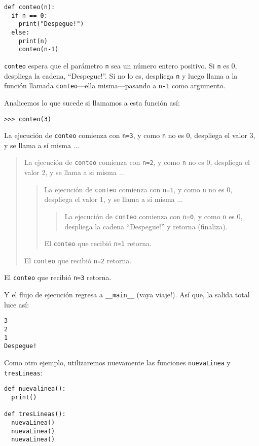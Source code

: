 \pagebreak{}

\begin{lstlisting}
def conteo(n):
  if n == 0:
    print("Despegue!")
  else:
    print(n)
    conteo(n-1)
\end{lstlisting}

\texttt{conteo} espera que el parámetro \texttt{n} sea un número entero
positivo. Si \texttt{n} es 0, despliega la cadena, ``Despegue!''.
Si no lo es, despliega \texttt{n} y luego llama a la función llamada
\texttt{conteo}—ella misma—pasando a \texttt{n-1} como argumento.

Analicemos lo que sucede si llamamos a esta función así:
\begin{lstlisting}
>>> conteo(3)
\end{lstlisting}

La ejecución de \texttt{conteo} comienza con \texttt{n=3}, y como
\texttt{n} no es 0, despliega el valor 3, y se llama a sí misma ...
\begin{quote}
La ejecución de \texttt{conteo} comienza con \texttt{n=2}, y como
\texttt{n} no es 0, despliega el valor 2, y se llama a si misma ...

\begin{quote}
La ejecución de \texttt{conteo} comienza con \texttt{n=1}, y como
\texttt{n} no es 0, despliega el valor 1, y se llama a sí misma ...

\begin{quote}
La ejecución de \texttt{conteo} comienza con \texttt{n=0}, y como
\texttt{n} es 0, despliega la cadena ``Despegue!'' y retorna (finaliza). 
\end{quote}
El \texttt{conteo} que recibió \texttt{n=1} retorna. 
\end{quote}
El \texttt{conteo} que recibió \texttt{n=2} retorna. 
\end{quote}
El \texttt{conteo} que recibió \texttt{n=3} retorna.

Y el flujo de ejecución regresa a \texttt{\_\_main\_\_} (vaya viaje!).
Así que, la salida total luce así:
\begin{verbatim}
3
2
1
Despegue!
\end{verbatim}
Como otro ejemplo, utilizaremos nuevamente las funciones \texttt{nuevaLinea}
y \texttt{tresLineas}:

\begin{lstlisting}
def nuevalinea():
  print()

def tresLineas():
  nuevaLinea()
  nuevaLinea()
  nuevaLinea()
\end{lstlisting}

